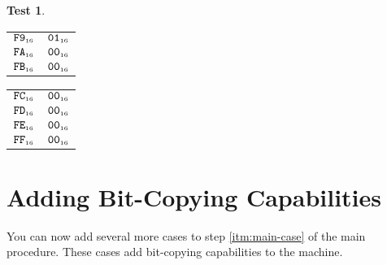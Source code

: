 \documentclass[a4paper,12pt]{article}
\makeatletter
\newcommand{\num}[1]{\texttt{#1}}
\newcommand{\hex}[1]{\num{#1}_{\textup{\tiny 16}}}
\newcommand{\MEM}[1]{\ifthenelse{\equal{#1}{}}{M}{M[#1]}}
\theoremstyle{definition}
\newtheorem{test}{Test}
\newenvironment{memtable}{%
  \begin{trivlist}
    \item
    }{%
    \end{trivlist}}
\newenvironment{memcolumn}{%
  \begin{tabular}{@{}ll@{}}
    \hline}
    {%
    \hline
  \end{tabular}}
\newcommand{\memspace}{\qquad}
\makeatother
\begin{document}
\begin{test}
\begin{memtable}
\begin{memcolumn}
      $\hex{F9}$ & $\hex{01}$ \\
      $\hex{FA}$ & $\hex{00}$ \\
      $\hex{FB}$ & $\hex{00}$ \\
    \end{memcolumn}
    \memspace
    \begin{memcolumn}
      $\hex{FC}$ & $\hex{00}$ \\
      $\hex{FD}$ & $\hex{00}$ \\
      $\hex{FE}$ & $\hex{00}$ \\
      $\hex{FF}$ & $\hex{00}$ \\
    \end{memcolumn}
  \end{memtable}
\end{test}

\section{Adding Bit-Copying Capabilities}

You can now add several more cases to step \ref{itm:main-case} of the main procedure.
These cases add bit-copying capabilities to the machine.
\end{document}
